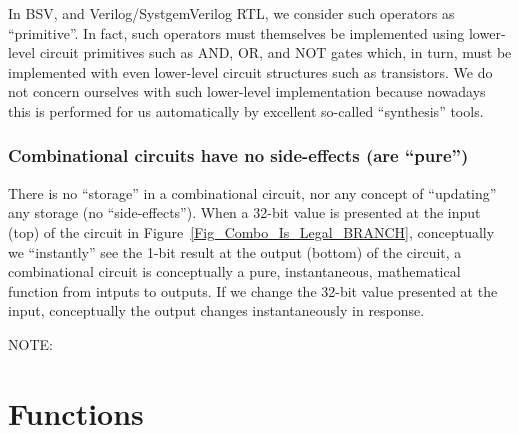 In BSV, and Verilog/SystgemVerilog RTL, we consider such operators as
``primitive''.  In fact, such operators must themselves be implemented
using lower-level circuit primitives such as AND, OR, and NOT gates
which, in turn, must be implemented with even lower-level circuit
structures such as transistors.  We do not concern ourselves with such
lower-level implementation because nowadays this is performed for us
automatically by excellent so-called ``synthesis'' tools.


\subsubsection{Combinational circuits have no side-effects (are ``pure'')}


There is no ``storage'' in a combinational circuit, nor any concept of
``updating'' any storage (no ``side-effects'').  When a 32-bit value
is presented at the input (top) of the circuit in
Figure~\ref{Fig_Combo_Is_Legal_BRANCH}, conceptually we
``instantly'' see the 1-bit result at the output (bottom) of the
circuit, {\ie} a combinational circuit is conceptually a pure,
instantaneous, mathematical function from intputs to outputs.  If we
change the 32-bit value presented at the input, conceptually the
output changes instantaneously in response.


NOTE: 


\section{Functions}

\label{BSV_functions}


